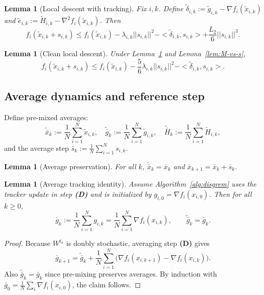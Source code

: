 \documentclass[11pt,a4paper]{article}
\def\norm#1{||#1||}%
\def\ip#1#2{<#1,#2>}%
\newtheorem{lemma}[theorem]{Lemma}
\newcommand{\ip}[2]{\left\langle #1,#2\right\rangle}
\newcommand{\norm}[1]{\left\|#1\right\|}
\begin{document}
	\begin{lemma}[Local descent with tracking]\label{lem:local-descent}
		Fix $i,k$. Define $\tilde\delta_{i,k}:=\tilde g_{i,k}-\nabla f_i(\tilde x_{i,k})$ and
		$\tilde e_{i,k}:=\tilde H_{i,k}-\nabla^2 f_i(\tilde x_{i,k})$.
		Then
		\begin{equation}\label{eq:local-descent}
			f_i(\tilde x_{i,k}+s_{i,k})
			\le f_i(\tilde x_{i,k})
			-\lambda_{i,k}\norm{s_{i,k}}^2
			-\ip{\tilde\delta_{i,k}}{s_{i,k}}
			+\frac{L_2}{6}\norm{s_{i,k}}^3.
		\end{equation}
	\end{lemma}
	
	\begin{lemma}[Clean local descent]\label{lem:local-clean}
		Under Lemma~\ref{lem:local-descent} and Lemma~\ref{lem:M-vs-s},
		\[
		f_i(\tilde x_{i,k}+s_{i,k})
		\le f_i(\tilde x_{i,k})
		-\frac{5}{6}\lambda_{i,k}\norm{s_{i,k}}^2
		-\ip{\tilde\delta_{i,k}}{s_{i,k}}.
		\]
	\end{lemma}
	
	\subsection{Average dynamics and reference step}
	Define pre-mixed averages:
	\[
	\tilde{\bar x}_k:=\frac1N\sum_{i=1}^N\tilde x_{i,k},\quad
	\tilde{\bar g}_k:=\frac1N\sum_{i=1}^N\tilde g_{i,k},\quad
	\tilde{\bar H}_k:=\frac1N\sum_{i=1}^N\tilde H_{i,k},
	\]
	and the average step $\bar s_k:=\frac1N\sum_{i=1}^N s_{i,k}$.
	
	\begin{lemma}[Average preservation]\label{lem:avg-pres}
		For all $k$, $\tilde{\bar x}_k=\bar x_k$ and $\bar x_{k+1}=\bar x_k+\bar s_k$.
	\end{lemma}
	
\begin{lemma}[Average tracking identity]\label{lem:avg-track}
	Assume Algorithm~\ref{alg:disgrem} uses the tracker update in step \textbf{(D)} and is initialized by
	$g_{i,0}=\nabla f_i(x_{i,0})$.
	Then for all $k\ge 0$,
	\[
	\bar g_k:=\frac1N\sum_{i=1}^N g_{i,k}=\frac1N\sum_{i=1}^N \nabla f_i(x_{i,k}),
	\qquad
	\tilde{\bar g}_k=\bar g_k.
	\]
\end{lemma}
\begin{proof}
	Because $W^{t_k}$ is doubly stochastic, averaging step \textbf{(D)} gives
	\[
	\bar g_{k+1}=\tilde{\bar g}_k+\frac1N\sum_{i=1}^N\big(\nabla f_i(x_{i,k+1})-\nabla f_i(x_{i,k})\big).
	\]
	Also $\tilde{\bar g}_k=\bar g_k$ since pre-mixing preserves averages.
	By induction with $\bar g_0=\frac1N\sum_i\nabla f_i(x_{i,0})$, the claim follows.
\end{proof}
	
\end{document}
